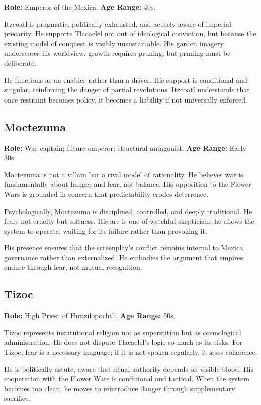 \documentclass[12pt]{article}
\begin{document}
\textbf{Role:} Emperor of the Mexica.  
\textbf{Age Range:} 40s.

Itzcoatl is pragmatic, politically exhausted, and acutely aware of imperial precarity. He supports Tlacaelel not out of ideological conviction, but because the existing model of conquest is visibly unsustainable. His garden imagery underscores his worldview: growth requires pruning, but pruning must be deliberate.

He functions as an enabler rather than a driver. His support is conditional and singular, reinforcing the danger of partial revolutions. Itzcoatl understands that once restraint becomes policy, it becomes a liability if not universally enforced.

\subsection*{Moctezuma}

\textbf{Role:} War captain; future emperor; structural antagonist.  
\textbf{Age Range:} Early 30s.

Moctezuma is not a villain but a rival model of rationality. He believes war is fundamentally about hunger and fear, not balance. His opposition to the Flower Wars is grounded in concern that predictability erodes deterrence.

Psychologically, Moctezuma is disciplined, controlled, and deeply traditional. He fears not cruelty but softness. His arc is one of watchful skepticism: he allows the system to operate, waiting for its failure rather than provoking it.

His presence ensures that the screenplay's conflict remains internal to Mexica governance rather than externalized. He embodies the argument that empires endure through fear, not mutual recognition.

\subsection*{Tizoc}

\textbf{Role:} High Priest of Huitzilopochtli.  
\textbf{Age Range:} 50s.

Tizoc represents institutional religion not as superstition but as cosmological administration. He does not dispute Tlacaelel's logic so much as its risks. For Tizoc, fear is a necessary language; if it is not spoken regularly, it loses coherence.

He is politically astute, aware that ritual authority depends on visible blood. His cooperation with the Flower Wars is conditional and tactical. When the system becomes too clean, he moves to reintroduce danger through supplementary sacrifice.
\end{document}
